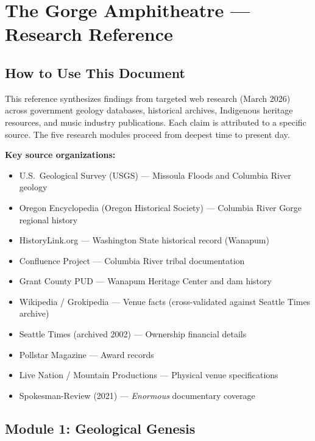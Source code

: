 \documentclass[11pt,letterpaper]{article}
\newcommand{\stageheader}[2]{%
  \noindent\colorbox{#2}{\makebox[\textwidth][l]{%
    \textcolor{white}{\bfseries\sffamily\hspace{6pt}#1\hspace{6pt}}}}%
  \vspace{0.5em}\par%
}
\begin{document}
\newpage
\stageheader{STAGE 2 --- RESEARCH REFERENCE}{secondary}

\section{The Gorge Amphitheatre --- Research Reference}

\subsection{How to Use This Document}

This reference synthesizes findings from targeted web research (March 2026) across government geology databases, historical archives, Indigenous heritage resources, and music industry publications. Each claim is attributed to a specific source. The five research modules proceed from deepest time to present day.

\textbf{Key source organizations:}
\begin{itemize}[noitemsep]
  \item U.S.\ Geological Survey (USGS) --- Missoula Floods and Columbia River geology
  \item Oregon Encyclopedia (Oregon Historical Society) --- Columbia River Gorge regional history
  \item HistoryLink.org --- Washington State historical record (Wanapum)
  \item Confluence Project --- Columbia River tribal documentation
  \item Grant County PUD --- Wanapum Heritage Center and dam history
  \item Wikipedia / Grokipedia --- Venue facts (cross-validated against Seattle Times archive)
  \item Seattle Times (archived 2002) --- Ownership financial details
  \item Pollstar Magazine --- Award records
  \item Live Nation / Mountain Productions --- Physical venue specifications
  \item Spokesman-Review (2021) --- \textit{Enormous} documentary coverage
\end{itemize}

\subsection{Module 1: Geological Genesis}
\end{document}
